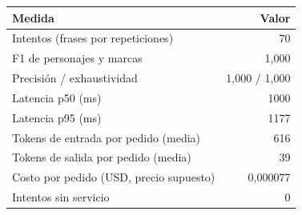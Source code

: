 \begin{tabular}{@{}lr@{}}\toprule
Medida & Valor\\\midrule
Intentos (frases por repeticiones) & 70\\
F1 de personajes y marcas & 1,000\\
Precisión / exhaustividad & 1,000 / 1,000\\
Latencia p50 (ms) & 1000\\
Latencia p95 (ms) & 1177\\
Tokens de entrada por pedido (media) & 616\\
Tokens de salida por pedido (media) & 39\\
Costo por pedido (USD, precio supuesto) & 0,000077\\
Intentos sin servicio & 0\\
\bottomrule\end{tabular}
